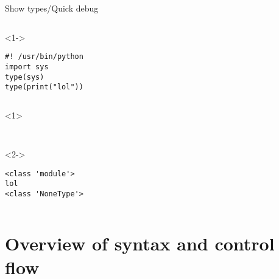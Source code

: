 \begin{frame}[fragile]{Show types/Quick debug}

  \begin{columns}[onlytextwidth]
    \begin{column}{\textwidth}
      \begin{onlyenv}<1->
        \begin{lstlisting}[style=python,title={types2.py}]
#! /usr/bin/python
import sys
type(sys)
type(print("lol")) \end{lstlisting}
      \end{onlyenv}
    \end{column}
  \end{columns}

    \begin{columns}[onlytextwidth]
    \begin{column}{\textwidth}
      \begin{onlyenv}<1>
        \begin{lstlisting}[style=sh]
%*\LSTPrompt*) python types2.py


        \end{lstlisting}
      \end{onlyenv}

      \begin{onlyenv}<2->
        \begin{lstlisting}[style=sh]
%*\LSTPrompt*) python types2.py
<class 'module'>
lol
<class 'NoneType'> \end{lstlisting}
      \end{onlyenv}
    \end{column}
  \end{columns}
\end{frame}


\section{Overview of syntax and control flow}

